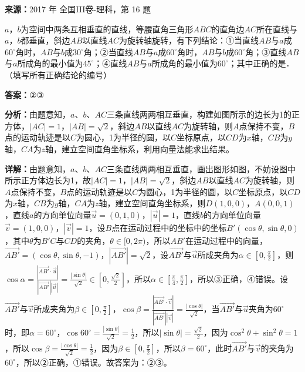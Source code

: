 \begin{question}[points=5]
\textbf{来源：}2017 年 全国III卷-理科，第 16 题\par
$a$，$b$为空间中两条互相垂直的直线，等腰直角三角形$ABC$的直角边$AC$所在直线与$a$，$b$都垂直，斜边$AB$以直线$AC$为旋转轴旋转，有下列结论：①当直线$AB$与$a$成$60^\circ$角时，$AB$与$b$成$30^\circ$角；②当直线$AB$与$a$成$60^\circ$角时，$AB$与$b$成$60^\circ$角；③直线$AB$与$a$所成角的最小值为$45^\circ$；④直线$AB$与$a$所成角的最小值为$60^\circ$；其中正确的是．（填写所有正确结论的编号）
\fillin[{$②③$}]
\begin{solution}
\textbf{答案：}$②③$

\textbf{分析：}由题意知，$a$、$b$、$AC$三条直线两两相互垂直，构建如图所示的边长为1的正方体，$|AC|=1$，$|AB|=\sqrt{2}$，斜边$AB$以直线$AC$为旋转轴，则$A$点保持不变，$B$点的运动轨迹是以$C$为圆心，1为半径的圆，以$C$坐标原点，以$CD$为$x$轴，$CB$为$y$轴，$CA$为$z$轴，建立空间直角坐标系，利用向量法能求出结果。

\textbf{详解：}由题意知，$a$、$b$、$AC$三条直线两两相互垂直，画出图形如图，不妨设图中所示正方体边长为1，故$|AC|=1$，$|AB|=\sqrt{2}$，斜边$AB$以直线$AC$为旋转轴，则$A$点保持不变，$B$点的运动轨迹是以$C$为圆心，1为半径的圆，以$C$坐标原点，以$CD$为$x$轴，$CB$为$y$轴，$CA$为$z$轴，建立空间直角坐标系，则$D(1,0,0)$，$A(0,0,1)$，直线$a$的方向单位向量$\overrightarrow{u}=(0,1,0)$，$|\overrightarrow{u}|=1$，直线$b$的方向单位向量$\overrightarrow{v}=(1,0,0)$，$|\overrightarrow{v}|=1$，设$B$点在运动过程中的坐标中的坐标$B'(\cos\theta,\sin\theta,0)$，其中$\theta$为$B'C$与$CD$的夹角，$\theta\in[0,2\pi)$，所以$AB'$在运动过程中的向量，$\overrightarrow{AB'}=(\cos\theta,\sin\theta,-1)$，$|\overrightarrow{AB'}|=\sqrt{2}$，设$\overrightarrow{AB'}$与$\overrightarrow{u}$所成夹角为$\alpha\in[0,\frac{\pi}{2}]$，则$\cos\alpha=\frac{|\overrightarrow{AB'}\cdot\overrightarrow{u}|}{|\overrightarrow{AB'}||\overrightarrow{u}|}=\frac{|\sin\theta|}{\sqrt{2}}\in[0,\frac{\sqrt{2}}{2}]$，所以$\alpha\in[\frac{\pi}{4},\frac{\pi}{2}]$，所以③正确，④错误。设$\overrightarrow{AB'}$与$\overrightarrow{v}$所成夹角为$\beta\in[0,\frac{\pi}{2}]$，$\cos\beta=\frac{|\overrightarrow{AB'}\cdot\overrightarrow{v}|}{|\overrightarrow{AB'}||\overrightarrow{v}|}=\frac{|\cos\theta|}{\sqrt{2}}$，当$\overrightarrow{AB'}$与$\overrightarrow{u}$夹角为$60^\circ$时，即$\alpha=60^\circ$，$\cos60^\circ=\frac{|\sin\theta|}{\sqrt{2}}=\frac{1}{2}$，所以$|\sin\theta|=\frac{\sqrt{2}}{2}$，因为$\cos^2\theta+\sin^2\theta=1$，所以$\cos\beta=\frac{|\cos\theta|}{\sqrt{2}}=\frac{1}{2}$，因为$\beta\in[0,\frac{\pi}{2}]$，所以$\beta=60^\circ$，此时$\overrightarrow{AB'}$与$\overrightarrow{v}$的夹角为$60^\circ$，所以②正确，①错误。故答案为：②③。
\end{solution}
\end{question}

